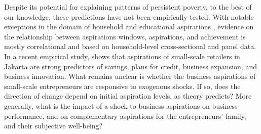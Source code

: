 \documentclass[11.5pt]{article}
\begin{document}



Despite its potential for explaining patterns of persistent poverty, to the best of our knowledge, these predictions have not been empirically tested. With notable exceptions in the domain of household and educational aspirations \citep[see,][]{Bernard2014, Riley2017, Macours2014, Beaman2012}, evidence on the relationship between aspirations windows, aspirations, and achievement is mostly correlational and based on household-level cross-sectional and panel data. In a recent empirical study, \citep{Dalton2018} shows that aspirations of small-scale retailers in Jakarta are strong predictors of savings, plans for credit, business expansion, and business innovation. What remains unclear is whether the business aspirations of small-scale entrepreneurs are responsive to exogenous shocks. If so, does the direction of change depend on initial aspiration levels, as theory predicts? More generally, what is the impact of a shock to business aspirations on business performance, and on complementary aspirations for the entrepreneurs' family, and their subjective well-being? %

\end{document}
